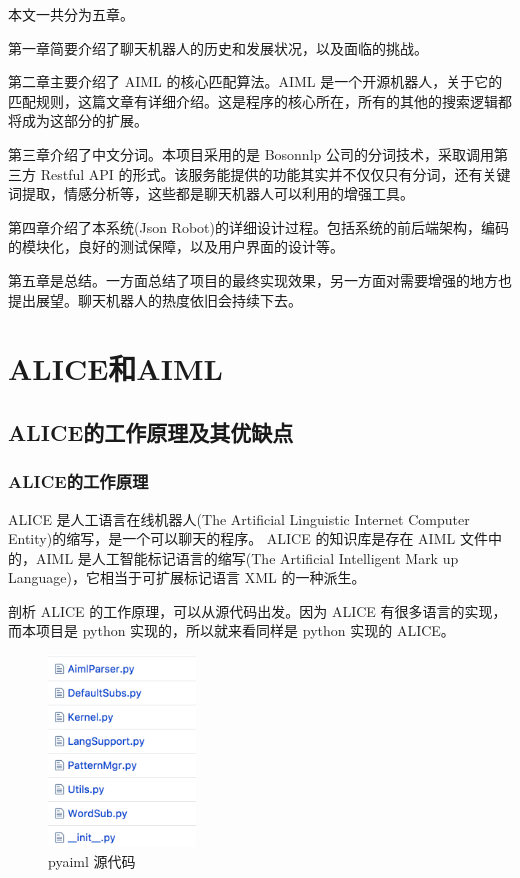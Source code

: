 \documentclass[bachelor,winfonts]{jnuthesis}
\begin{document}
本文一共分为五章。

第一章简要介绍了聊天机器人的历史和发展状况，以及面临的挑战。

第二章主要介绍了 AIML 的核心匹配算法。AIML 是一个开源机器人，关于它的匹配规则，这篇文章有详细介绍\cite{aiml-match-pattern}。这是程序的核心所在，所有的其他的搜索逻辑都将成为这部分的扩展。

第三章介绍了中文分词。本项目采用的是 Bosonnlp 公司的分词技术，采取调用第三方 Restful API 的形式。该服务能提供的功能其实并不仅仅只有分词，还有关键词提取，情感分析等，这些都是聊天机器人可以利用的增强工具。

第四章介绍了本系统(Json Robot)的详细设计过程。包括系统的前后端架构，编码的模块化，良好的测试保障，以及用户界面的设计等。

第五章是总结。一方面总结了项目的最终实现效果，另一方面对需要增强的地方也提出展望。聊天机器人的热度依旧会持续下去。


\chapter{ALICE和AIML}
\section{ALICE的工作原理及其优缺点}
\subsection{ALICE的工作原理}
ALICE \cite{夏天2004基于}是人工语言在线机器人(The Artificial Linguistic Internet Computer Entity)的缩写，是一个可以聊天的程序。 ALICE 的知识库是存在 AIML 文件中的，AIML 是人工智能标记语言的缩写(The Artificial Intelligent Mark up Language)，它相当于可扩展标记语言 XML 的一种派生。

剖析 ALICE 的工作原理，可以从源代码出发。因为 ALICE 有很多语言的实现，而本项目是 python 实现的，所以就来看同样是 python 实现\cite{github-pyaiml}的 ALICE。

\begin{figure}[htbp]
  \centering
  \includegraphics[width= 0.35\textwidth, height=0.45\textwidth]{pyaiml-project.png}
  \caption{pyaiml 源代码}\label{fig:pic2}
\end{figure}
\end{document}
